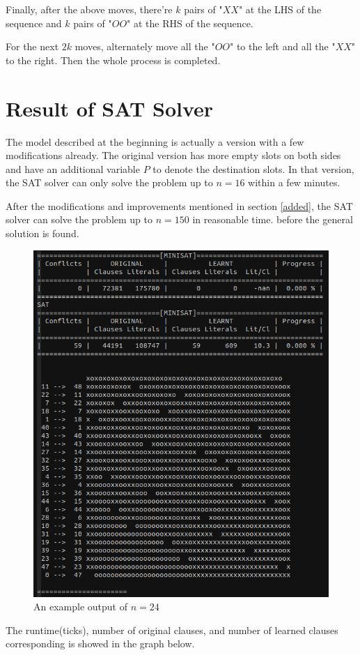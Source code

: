 \documentclass{article}
\begin{document}
    Finally, after the above moves, there're $k$ pairs of "$XX$" at the LHS of
    the sequence and $k$ pairs of "$OO$" at the RHS of the sequence.

    For the next $2k$ moves, alternately move all the "$OO$" to the left
    and all the "$XX$" to the right. Then the whole process is completed.



    \section{Result of SAT Solver}
        
    The model described at the beginning is actually 
    a version with a few modifications already.
    The original version has more empty slots on both sides
    and have an additional variable $P$ to denote the destination slots.
    In that version, the SAT solver
    can only solve the problem up to $n=16$ within a few minutes.

    After the modifications and improvements mentioned in section \ref{added}, 
    the SAT solver can solve the problem up to $n=150$ in reasonable time.
    before the general solution is found.

    \begin{figure}[h]
        \begin{minipage}{0.99\textwidth}
        \centering
        \includegraphics[width=.6\textwidth]{img/24.png}
        \caption{An example output of $n=24$}
        \end{minipage}
    \end{figure}

    The runtime(ticks), number of original clauses, and number of learned clauses
    corresponding is showed in the graph below.
\end{document}
